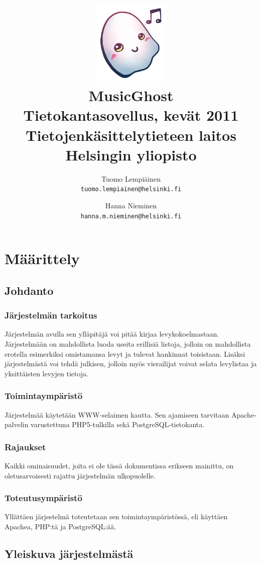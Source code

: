 \documentclass[a4paper,12pt]{report}
\title{\includegraphics[width=5em]{logo}\\\vspace{1em}MusicGhost\\\vspace{1em}
  \large{Tietokantasovellus, kevät 2011\\Tietojenkäsittelytieteen
  laitos\\Helsingin yliopisto}\\}
\author{Tuomo Lempiäinen\\\texttt{tuomo.lempiainen@helsinki.fi} \and
Hanna Nieminen\\\texttt{hanna.m.nieminen@helsinki.fi}}
\begin{document}
\maketitle

\tableofcontents

\chapter{Määrittely}

\section{Johdanto}

\subsection{Järjestelmän tarkoitus}
Järjestelmän avulla sen ylläpitäjä voi pitää kirjaa levykokoelmastaan.
Järjestelmään on mahdollista luoda useita erillisiä listoja, jolloin on
mahdollista erotella esimerkiksi omistamansa levyt ja tulevat hankinnat
toisistaan.  Lisäksi järjestelmästä voi tehdä julkisen, jolloin myös vierailijat
voivat selata levylistaa ja yksittäisten levyjen tietoja.

\subsection{Toimintaympäristö}
Järjestelmää käytetään WWW-selaimen kautta. Sen ajamiseen tarvitaan
Apache-palvelin varustettuna PHP5-tulkilla sekä PostgreSQL-tietokanta.

\subsection{Rajaukset}
Kaikki ominaisuudet, joita ei ole tässä dokumentissa erikseen mainittu, on
oletusarvoisesti rajattu järjestelmän ulkopuolelle.

\subsection{Toteutusympäristö}
Yllättäen järjestelmä toteutetaan sen toimintaympäristössä, eli käyttäen
Apachea, PHP:tä ja PostgreSQL:ää.

\section{Yleiskuva järjestelmästä}
\end{document}

